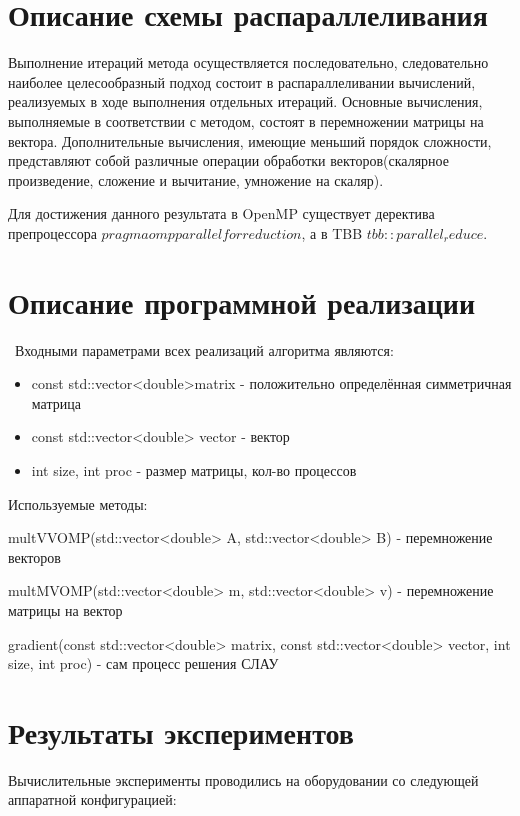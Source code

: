 \documentclass{report}
\begin{document}
 \newpage

 \section*{Описание схемы распараллеливания}

 Выполнение итераций метода осуществляется последовательно, следовательно наиболее целесообразный подход состоит в распараллеливании вычислений, реализуемых в ходе выполнения отдельных итераций. Основные вычисления, выполняемые в соответствии с методом, состоят в перемножении матрицы на вектора. Дополнительные вычисления, имеющие меньший порядок сложности, представляют собой различные операции обработки векторов(скалярное произведение, сложение и вычитание, умножение на скаляр).
 \par Для достижения данного результата в OpenMP существует деректива препроцессора $pragma omp parallel for reduction$, а в TBB $tbb::parallel_reduce$.
 \newpage

 \section*{Описание программной реализации}
 \
 Входными параметрами всех реализаций алгоритма являются:
 \begin{itemize}
 \item const std::vector<double>matrix - положительно определённая симметричная матрица
 \item const std::vector<double> vector - вектор
 \item int size, int proc - размер матрицы, кол-во процессов
 \end{itemize}

 \par Используемые методы:
 \par multVVOMP(std::vector<double> A, std::vector<double> B) - перемножение векторов
 \par multMVOMP(std::vector<double> m, std::vector<double> v) - перемножение матрицы на вектор
 \par gradient(const std::vector<double> matrix, const std::vector<double> vector, int size, int proc) - сам процесс решения СЛАУ

 \newpage

 \section*{Результаты экспериментов}
 Вычислительные эксперименты проводились на оборудовании со следующей аппаратной конфигурацией:
\end{document}
